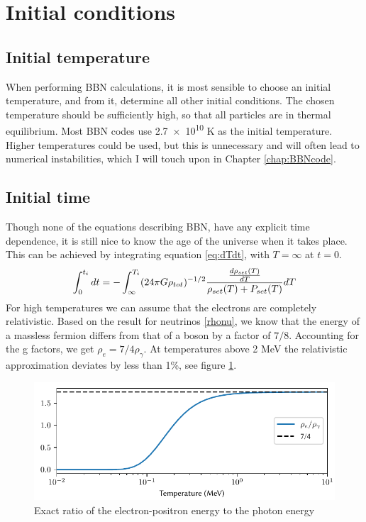 
\section{Initial conditions}

\subsection{Initial temperature}
When performing BBN calculations, it is most sensible to choose an initial temperature, and from it, determine all other initial conditions. The chosen temperature should be sufficiently high, so that all particles are in thermal equilibrium. Most BBN codes use \num{2.7e10} K as the initial temperature. Higher temperatures could be used, but this is unnecessary and will often lead to numerical instabilities, which I will touch upon in Chapter \ref{chap:BBNcode}.

\subsection{Initial time}
\label{sec:t_ini}
Though none of the equations describing BBN, have any explicit time dependence, it is still nice to know the age of the universe when it takes place. This can be achieved by integrating equation \eqref{eq:dTdt}, with $T=\infty$ at $t=0$.
\begin{align}
    \int_{0}^{t_i}dt=-\int_{\infty}^{T_i}(24\pi G\rho_{tot})^{-1/2}\frac{\frac{d\rho_{set}(T)}{dT}}{\rho_{set}(T) + P_{set}(T)}dT
    \label{eq:ti_integral}
\end{align}
For high temperatures we can assume that the electrons are completely relativistic. Based on the result for neutrinos \eqref{rhonu}, we know that the energy of a massless fermion differs from that of a boson by a factor of $7/8$. Accounting for the g factors, we get $\rho_e=7/4 \rho_\gamma$. At temperatures above 2 MeV the relativistic approximation deviates by less than 1\%, see figure \ref{fig:rhoegammaT}.
\begin{figure}[ht]
    \includegraphics[width=5.1in]{figures/rhoegammaT.pdf}
    \caption{Exact ratio of the electron-positron energy to the photon energy}
    \label{fig:rhoegammaT}
\end{figure}

